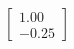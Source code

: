 \documentclass[preview]{standalone}
\begin{document}
\begin{align*}
\begin{bmatrix} 1.00 \\ -0.25 \end{bmatrix}
\end{align*}
\end{document}
